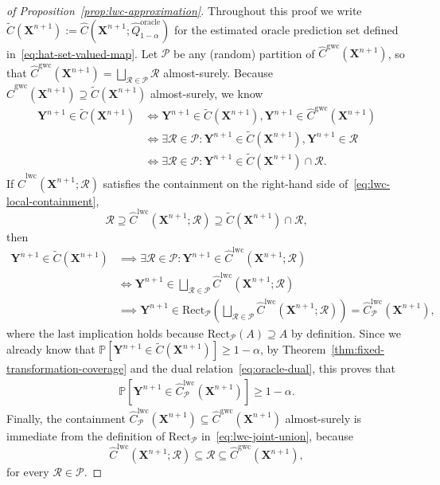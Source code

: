 \begin{proof}[of Proposition~\ref{prop:lwc-approximation}]
Throughout this proof we write $\tilde{C}(\mathbf{X}^{n+1}) := \hat{C}(\mathbf{X}^{n+1}; \hat{Q}^{\mathrm{oracle}}_{1-\alpha})$ for the estimated oracle prediction set defined in~\eqref{eq:hat-set-valued-map}.
Let $\mathcal{P}$ be any (random) partition of $\hat{C}^{\mathrm{gwc}}(\mathbf{X}^{n+1})$, so that $\hat{C}^{\mathrm{gwc}}(\mathbf{X}^{n+1}) = \bigsqcup_{\mathcal{R} \in \mathcal{P}}\mathcal{R}$ almost-surely. Because $\hat{C}^{\mathrm{gwc}}(\mathbf{X}^{n+1}) \supseteq \tilde{C}(\mathbf{X}^{n+1})$ almost-surely, we know
\begin{align*}
    \mathbf{Y}^{n+1} \in \tilde{C}(\mathbf{X}^{n+1})
    &\iff \mathbf{Y}^{n+1} \in \tilde{C}(\mathbf{X}^{n+1}), \mathbf{Y}^{n+1} \in \hat{C}^{\mathrm{gwc}}(\mathbf{X}^{n+1})\\
    &\iff \exists \mathcal{R} \in \mathcal{P}:  \mathbf{Y}^{n+1} \in \tilde{C}(\mathbf{X}^{n+1}), \mathbf{Y}^{n+1} \in \mathcal{R}\\
    &\iff \exists \mathcal{R} \in \mathcal{P}:  \mathbf{Y}^{n+1} \in \tilde{C}(\mathbf{X}^{n+1}) \cap \mathcal{R}.
\end{align*}
If $\hat{C}^\mathrm{lwc}(\mathbf{X}^{n+1}; \mathcal{R})$ satisfies the containment on the right-hand side of~\eqref{eq:lwc-local-containment},
\[
\mathcal{R}\supseteq \hat{C}^\mathrm{lwc}(\mathbf{X}^{n+1}; \mathcal{R}) \supseteq \tilde{C}(\mathbf{X}^{n+1}) \cap \mathcal{R},
\]
then
\begin{align*}
    \mathbf{Y}^{n+1} \in \tilde{C}(\mathbf{X}^{n+1}) &\implies \exists \mathcal{R}\in \mathcal{P}: \mathbf{Y}^{n+1} \in \hat{C}^\mathrm{lwc}(\mathbf{X}^{n+1}; \mathcal{R})\\
 &\iff \mathbf{Y}^{n+1} \in \bigsqcup_{\mathcal{R} \in \mathcal{P}}\hat{C}^\mathrm{lwc}(\mathbf{X}^{n+1}; \mathcal{R})\\
 &\implies \mathbf{Y}^{n+1} \in \mathrm{Rect}_{\mathcal{P}}\left(\bigsqcup_{\mathcal{R} \in \mathcal{P}}\hat{C}^\mathrm{lwc}(\mathbf{X}^{n+1}; \mathcal{R})\right) = \hat{C}^{\mathrm{lwc}}_{\mathcal{P}}(\mathbf{X}^{n+1}),
\end{align*}
where the last implication holds because $\mathrm{Rect}_{\mathcal{P}}(A) \supseteq A$ by definition.
Since we already know that $\mathbb{P}[\mathbf{Y}^{n+1} \in \tilde{C}(\mathbf{X}^{n+1})] \geq 1-\alpha$, by Theorem~\ref{thm:fixed-transformation-coverage} and the dual relation~\eqref{eq:oracle-dual}, this proves that
\begin{align*}
  \mathbb{P} \left[ \mathbf{Y}^{n+1} \in \hat{C}^\mathrm{lwc}_{\mathcal{P}}(\mathbf{X}^{n+1}) \right] \geq 1-\alpha.
\end{align*}
Finally, the containment $\hat{C}^\mathrm{lwc}_{\mathcal{P}}(\mathbf{X}^{n+1}) \subseteq \hat{C}^\mathrm{gwc}(\mathbf{X}^{n+1})$ almost-surely is immediate from the definition of $\mathrm{Rect}_{\mathcal{P}}$ in~\eqref{eq:lwc-joint-union}, because 
\[
\hat{C}^\mathrm{lwc}(\mathbf{X}^{n+1}; \mathcal{R}) \subseteq \mathcal{R} \subseteq \hat{C}^\mathrm{gwc}(\mathbf{X}^{n+1}),
\]
for every $\mathcal{R} \in \mathcal{P}$.
\end{proof}

